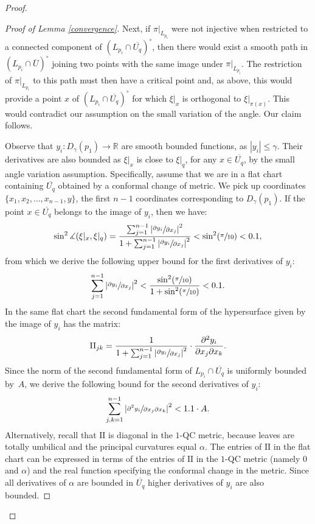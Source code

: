 \documentclass[JEP,XML,SOM,Unicode]{cedram}
\newcommand{\II}{\mathrm{II}}
\newcommand{\Psfrac}[2]{(\sfrac{#1}{#2})}
\theoremstyle{definition}
\theoremstyle{remark}
\numberwithin{equation}{section}
\newcommand{\RR}{\mathbb R}
\begin{document}
\begin{proof}
\begin{proof}[Proof of Lemma \ref{convergence}]
Next, if $\pi|_{L_{p_i}}$ were not injective when restricted to a connected component of $(L_{p_i}\cap \overline{U_q})^{\circ}$,
then there would exist a smooth path in $(L_{p_i}\cap \overline{U})^{\circ}$ joining two points with the same image under $\pi|_{L_{p_i}}$. The restriction of $\pi|_{L_{p_i}}$ to this path must then have a critical point and, as above, this would provide a
point $x$ of $(L_{p_i}\cap \overline{U_q})^{\circ}$ for which $\xi|_x$ is orthogonal to $\xi|_{\pi(x)}$. This would contradict
our assumption on the small variation of the angle. Our claim follows.

Observe that $y_i:D_{\gamma}(p_1)\to \RR$ are smooth bounded functions, as $ |y_i|\leq \gamma$.
Their derivatives are also bounded as $\xi|_{x}$ is close
to $\xi|_{q}$, for any $x\in \overline{U_q}$, by the small angle variation assumption.
Specifically, assume that we are in a flat chart containing $\overline{U_q}$ \hbox{obtained} by a conformal change of metric.
We pick up coordinates $\{x_1,x_2, \ldots,x_{n-1},y\}$, the first $n-1$ coordinates corresponding to $D_{\gamma}(p_1)$.
If the point $x\in \overline{U_q}$ belongs to the image of $y_i$, then we have:
\[ \sin^2\measuredangle(\xi|_{x},\xi|_{q})=\frac{\sum_{j=1}^{n-1}\left| \sfrac{\partial y_i}{\partial x_j}\right|^2}
{1+\sum_{j=1}^{n-1}\left| \sfrac{\partial y_i}{\partial x_j}\right|^2} <\sin^2\Psfrac{\pi}{10} < 0.1,\]
from which we derive the following upper bound for the first derivatives of $y_i$:
\[ \sum_{j=1}^{n-1}\left| \sfrac{\partial y_i}{\partial x_j}\right|^2 < \frac{\sin^2\Psfrac{\pi}{10}}{1+ \sin^2\Psfrac{\pi}{10}}<0.1.\]
In the same flat chart the second fundamental form of the hypersurface given by the image of $y_i$ has the matrix:
\[ \II_{jk}= \frac{1}{1+\sum_{j=1}^{n-1}\left| \sfrac{\partial y_i}{\partial x_j}\right|^2}\cdot \frac{\partial^2 y_i}{\partial x_j \partial x_k}.\]
Since the norm of the second fundamental form of $L_{p_i}\cap \overline{U_q}$ is uniformly bounded by~$A$, we derive the following bound for the second derivatives of $y_i$:\vspace*{-3pt}\enlargethispage{.5\baselineskip}%
\[ \sum_{j,k=1}^{n-1}\left| \sfrac{\partial^2 y_i}{\partial x_j\partial x_k}\right|^2 < 1.1\cdot A.\]
Alternatively, recall that $\II$ is diagonal in the $1$-QC metric, because leaves are totally umbilical and the principal curvatures
equal $\alpha$. The entries of $\II$ in the flat chart can be expressed in terms of the entries of $\II$ in the $1$-QC metric (namely $0$ and $\alpha$) and the real function specifying the conformal change in the metric. Since all derivatives of $\alpha$ are bounded in $\overline{U_q}$ higher derivatives of $y_i$ are also bounded.


\end{proof}
\end{proof}
\end{document}
